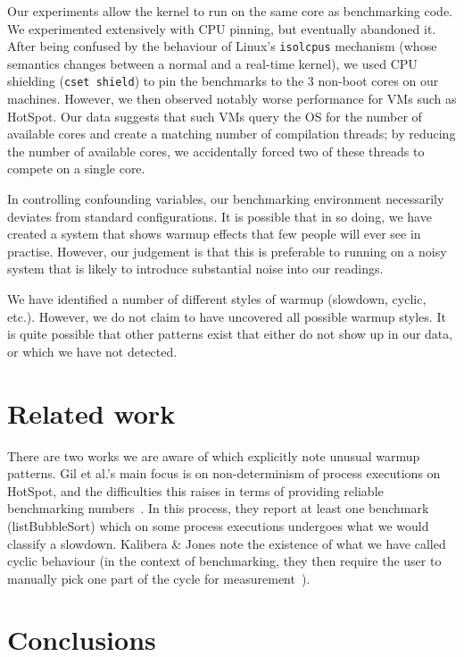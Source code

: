 \documentclass[preprint,numbers,10pt]{sigplanconf}
\newcommand{\kalibera}{Kalibera \& Jones\xspace}
\begin{document}
Our experiments allow the kernel to run on the same core as benchmarking code.
We experimented extensively with CPU pinning, but eventually abandoned it. After
being confused by the behaviour of Linux's \texttt{isolcpus} mechanism (whose
semantics changes between a normal and a real-time kernel), we used CPU shielding
(\texttt{cset shield}) to pin the benchmarks to the 3 non-boot cores on our
machines. However, we then observed notably worse performance for VMs such as
HotSpot. Our data suggests that such VMs query the OS for the number of
available cores and create a matching number of compilation threads; by reducing
the number of available cores, we accidentally forced two of these threads to
compete on a single core.

In controlling confounding variables, our benchmarking environment necessarily
deviates from standard configurations. It is possible that in so doing, we have
created a system that shows warmup effects that few people will ever see in
practise. However, our judgement is that this is preferable to running on a
noisy system that is likely to introduce substantial noise into our readings.

We have identified a number of different styles of warmup (slowdown, cyclic,
etc.). However, we do not claim to have uncovered all possible warmup styles. It
is quite possible that other patterns exist that either do not show up in our
data, or which we have not detected.


\section{Related work}

There are two works we are aware of which explicitly note unusual warmup
patterns. Gil et al.'s main focus is on non-determinism of process executions on
HotSpot, and the difficulties this raises in terms of providing reliable
benchmarking numbers~\cite{gil11microbenchmark}. In this process, they report at
least one benchmark (listBubbleSort) which on some process executions undergoes what we
would classify a slowdown. \kalibera note the
existence of what we have called cyclic behaviour (in the context of benchmarking,
they then require the user to
manually pick one part of the cycle for measurement~\cite{kalibera13rigorous}).


\section{Conclusions}
\label{sec:conclusion}
\end{document}
